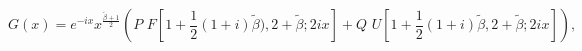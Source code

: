 \begin{equation}
G(x)=e^{-ix} x^{\frac{\tilde{\beta}+1}{2}}\left(P\,\,F\left[1
+\frac{1}{2}(1+i)\tilde{\beta}),2+\tilde{\beta};2ix\right]+Q
\,\,U\left[1+\frac{1}{2}(1+i)\tilde{\beta},2+\tilde{\beta};2
ix\right]\right),
\end{equation}

